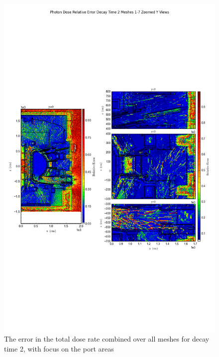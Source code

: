\documentclass[12pt]{article}
\begin{document}
\begin{figure}[ht!]
\centering
\includegraphics[trim={0cm 9cm 0cm 10cm},clip,scale=0.75]{../plots/final_model_with_b4c/Photon_Dose_Relative_Error_Decay_Time_2_Meshes_1-7_Zoomed_Y_Views.png}
\caption{The error in the total dose rate combined over all meshes for decay time 2, with focus on the port areas}
\label{fig:photons_dc2_b4c_total_error_zoomed}
\end{figure}
\clearpage
\end{document}
